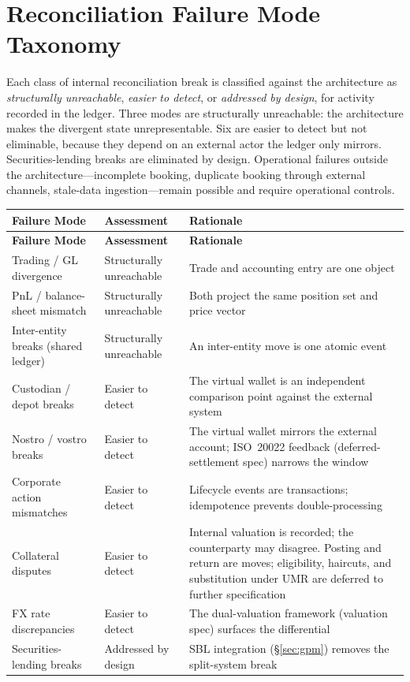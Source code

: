 \documentclass[11pt,a4paper]{article}
\begin{document}
\section{Reconciliation Failure Mode Taxonomy}
\label{app:reconciliation}

Each class of internal reconciliation break is classified against the architecture as \emph{structurally unreachable}, \emph{easier to detect}, or \emph{addressed by design}, for activity recorded in the ledger. Three modes are structurally unreachable: the architecture makes the divergent state unrepresentable. Six are easier to detect but not eliminable, because they depend on an external actor the ledger only mirrors. Securities-lending breaks are eliminated by design. Operational failures outside the architecture---incomplete booking, duplicate booking through external channels, stale-data ingestion---remain possible and require operational controls.

\begin{center}
\begin{longtable}{p{4.3cm} p{3cm} p{5.7cm}}
\toprule
\textbf{Failure Mode} & \textbf{Assessment} & \textbf{Rationale} \\
\midrule
\endfirsthead
\toprule
\textbf{Failure Mode} & \textbf{Assessment} & \textbf{Rationale} \\
\midrule
\endhead
Trading / GL divergence & Structurally unreachable & Trade and accounting entry are one object \\
\midrule
PnL / balance-sheet mismatch & Structurally unreachable & Both project the same position set and price vector \\
\midrule
Inter-entity breaks (shared ledger) & Structurally unreachable & An inter-entity move is one atomic event \\
\midrule
Custodian / depot breaks & Easier to detect & The virtual wallet is an independent comparison point against the external system \\
\midrule
Nostro / vostro breaks & Easier to detect & The virtual wallet mirrors the external account; ISO~20022 feedback (deferred-settlement spec) narrows the window \\
\midrule
Corporate action mismatches & Easier to detect & Lifecycle events are transactions; idempotence prevents double-processing \\
\midrule
Collateral disputes & Easier to detect & Internal valuation is recorded; the counterparty may disagree. Posting and return are moves; eligibility, haircuts, and substitution under UMR are deferred to further specification \\
\midrule
FX rate discrepancies & Easier to detect & The dual-valuation framework (valuation spec) surfaces the differential \\
\midrule
Securities-lending breaks & Addressed by design & SBL integration (\S\ref{sec:gpm}) removes the split-system break \\
\bottomrule
\end{longtable}
\end{center}
\end{document}
